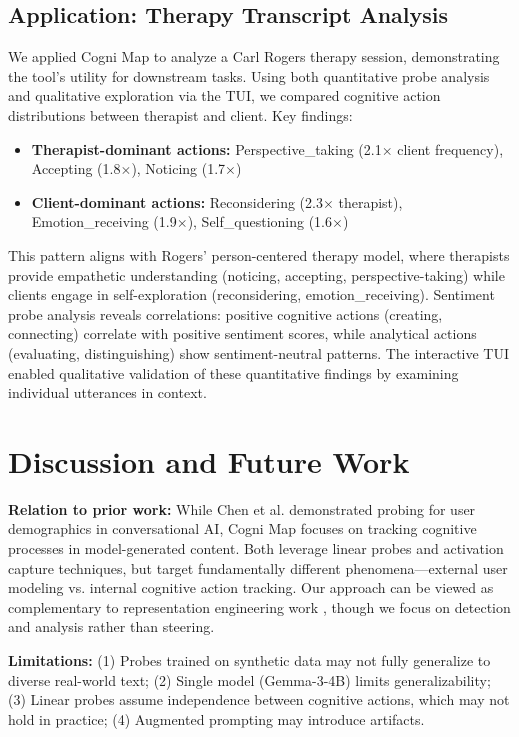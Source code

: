 \documentclass[letterpaper]{article}
\begin{document}
\subsection{Application: Therapy Transcript Analysis}

We applied Cogni Map to analyze a Carl Rogers therapy session, demonstrating the tool's utility for downstream tasks. Using both quantitative probe analysis and qualitative exploration via the TUI, we compared cognitive action distributions between therapist and client. Key findings:
\begin{itemize}
    \item \textbf{Therapist-dominant actions:} Perspective\_taking (2.1$\times$ client frequency), Accepting (1.8$\times$), Noticing (1.7$\times$)
    \item \textbf{Client-dominant actions:} Reconsidering (2.3$\times$ therapist), Emotion\_receiving (1.9$\times$), Self\_questioning (1.6$\times$)
\end{itemize}

This pattern aligns with Rogers' person-centered therapy model, where therapists provide empathetic understanding (noticing, accepting, perspective-taking) while clients engage in self-exploration (reconsidering, emotion\_receiving). Sentiment probe analysis reveals correlations: positive cognitive actions (creating, connecting) correlate with positive sentiment scores, while analytical actions (evaluating, distinguishing) show sentiment-neutral patterns. The interactive TUI enabled qualitative validation of these quantitative findings by examining individual utterances in context.

\section{Discussion and Future Work}

\textbf{Relation to prior work:} While Chen et al. \cite{chen2024designing} demonstrated probing for user demographics in conversational AI, Cogni Map focuses on tracking cognitive processes in model-generated content. Both leverage linear probes \cite{alain2016understanding} and activation capture techniques, but target fundamentally different phenomena---external user modeling vs. internal cognitive action tracking. Our approach can be viewed as complementary to representation engineering work \cite{zou2023representation}, though we focus on detection and analysis rather than steering.

\textbf{Limitations:} (1) Probes trained on synthetic data may not fully generalize to diverse real-world text; (2) Single model (Gemma-3-4B) limits generalizability; (3) Linear probes assume independence between cognitive actions, which may not hold in practice; (4) Augmented prompting may introduce artifacts.
\end{document}
